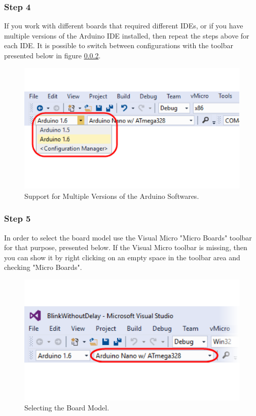 \begin{refsection}
\subsubsection{Step 4}
If you work with different boards that required different IDEs, or if you have multiple versions of the Arduino IDE installed, then repeat the steps above for each IDE. It is possible to switch between configurations with the toolbar presented below in figure \ref{}.

\begin{figure}[H]
	\centering
	\includegraphics[width=0.7\linewidth]{./sdf/arduino_quantum_rx/figures/multipleIDEversions.pdf}
	\caption{Support for Multiple Versions of the Arduino Softwares.}
	\label{multipleIDEversions}
\end{figure}


\subsubsection{Step 5}

In order to select the board model use the Visual Micro "Micro Boards" toolbar for that purpose, presented below. If the Visual Micro toolbar is missing, then you can show it by right clicking on an empty space in the toolbar area and checking "Micro Boards".


\begin{figure}[H]
	\centering
	\includegraphics[width=0.7\linewidth]{./sdf/arduino_quantum_rx/figures/boardSelect.pdf}
	\caption{Selecting the Board Model.}
	\label{boardSelect}
\end{figure}


\end{refsection}
